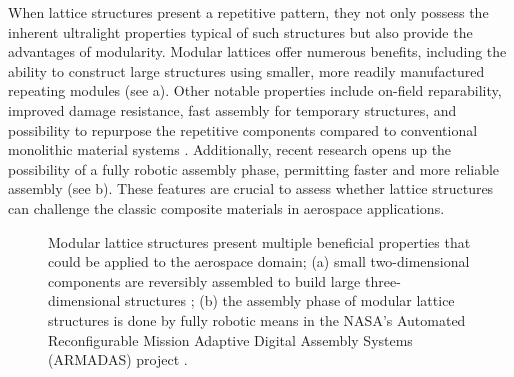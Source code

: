 When lattice structures present a repetitive pattern, they not only possess the inherent ultralight properties typical of such structures but also provide the advantages of modularity. Modular lattices offer numerous benefits, including the ability to construct large structures using smaller, more readily manufactured repeating modules (see a). Other notable properties include on-field reparability, improved damage resistance, fast assembly for temporary structures, and possibility to repurpose the repetitive components compared to conventional monolithic material systems . Additionally, recent research opens up the possibility of a fully robotic assembly phase, permitting faster and more reliable assembly (see b). These features are crucial to assess whether lattice structures can challenge the classic composite materials in aerospace applications.

\begin{figure}
    \hspace*{\fill}
    \hfill
    \hspace*{\fill}
    \caption{Modular lattice structures present multiple beneficial properties that could be applied to the aerospace domain; (a) small two-dimensional components are reversibly assembled to build large three-dimensional structures \cite{cheung_reversibly_2013}; (b) the assembly phase of modular lattice structures is done by fully robotic means in the NASA's Automated Reconfigurable Mission Adaptive Digital Assembly Systems (ARMADAS) project \cite{costa_algorithmic_2020}.}
    \label{fig:01_fab}
\end{figure}


